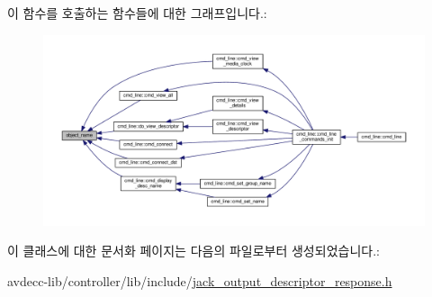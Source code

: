 이 함수를 호출하는 함수들에 대한 그래프입니다.\+:
\nopagebreak
\begin{figure}[H]
\begin{center}
\leavevmode
\includegraphics[width=350pt]{classavdecc__lib_1_1descriptor__response__base_a133f7774946d80f82b8aaaa4cfbb7361_icgraph}
\end{center}
\end{figure}




이 클래스에 대한 문서화 페이지는 다음의 파일로부터 생성되었습니다.\+:\begin{DoxyCompactItemize}
\item 
avdecc-\/lib/controller/lib/include/\hyperlink{jack__output__descriptor__response_8h}{jack\+\_\+output\+\_\+descriptor\+\_\+response.\+h}\end{DoxyCompactItemize}
